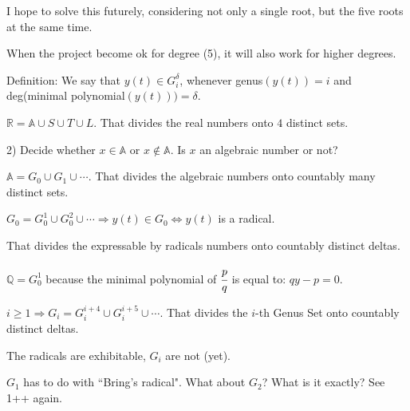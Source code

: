 \documentclass[12pt]{article}
\begin{document}
I hope to solve this futurely, considering not only a single root, but the five roots at the same time.

When the project become ok for degree (5), it will also work for higher degrees.

\vspace{3mm}

Definition: We say that $y(t) \in G_i^\delta$, whenever genus$(y(t)) = i$ and deg(minimal polynomial$(y(t))) = \delta$.

\vspace{3mm}

$\mathbb{R} = \mathbb{A} \cup S \cup T \cup L$. That divides the real numbers onto $4$ distinct sets.

\vspace{3mm}

2) Decide whether $x \in \mathbb{A}$ or $x \notin \mathbb{A}$. Is $x$ an algebraic number or not?

\vspace{3mm}

$\mathbb{A} = G_0 \cup G_1 \cup \cdots$. That divides the algebraic numbers onto countably many distinct sets.

\vspace{3mm}

$G_0 = G_0^1 \cup G_0^2 \cup \cdots \Rightarrow y(t) \in G_0 \Leftrightarrow y(t)$ is a radical. 

\vspace{3mm}

That divides the expressable by radicals numbers onto countably distinct deltas.

\vspace{3mm}

$\mathbb{Q} = G_0^1$ because the minimal polynomial of $\cfrac{p}{q}$ is equal to: $qy - p = 0$.

\vspace{3mm}

$i \ge 1 \Rightarrow G_i = G_i^{i + 4} \cup G_i^{i + 5} \cup \cdots$. That divides the $i$-th Genus Set onto countably distinct deltas.

\vspace{3mm}

The radicals are exhibitable, $G_i$ are not (yet).

\vspace{3mm}

$G_1$ has to do with ``Bring's radical". What about $G_2$? What is it exactly? See 1++ again.
\end{document}
